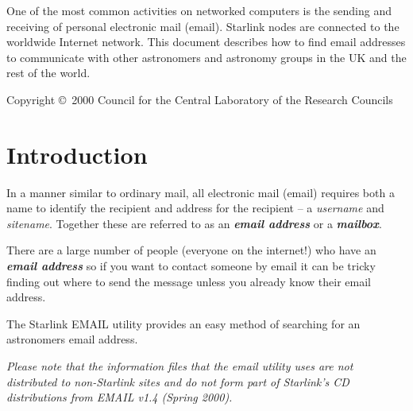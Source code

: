 \documentclass[twoside,11pt]{article}
\newcommand{\stardocinitials}  {SUN}
\newcommand{\stardoccopyright} 
{Copyright \copyright\ 2000 Council for the Central Laboratory of the Research Councils}
\newcommand{\stardocnumber}    {182.7}
\newcommand{\stardocabstract}  {
One of the most common activities on networked computers is the sending
and receiving of personal electronic mail (email).  Starlink nodes are
connected to the worldwide Internet network.  This document describes
how to find email addresses to communicate with other astronomers
and astronomy groups in the UK and the rest of the world.
}
\newcommand{\stardocname}{\stardocinitials /\stardocnumber}
\newenvironment{latexonly}{}{}
\newcommand{\xlabel}[1]{}
\renewcommand{\_}{\texttt{\symbol{95}}}
\renewcommand{\thepage}{\roman{page}}
\begin{document}
\stardocabstract


  \newpage
  \begin{latexonly}
    \setlength{\parskip}{0mm}
    \tableofcontents
\vspace*{\fill}
\stardoccopyright
    \setlength{\parskip}{\medskipamount}
    \markboth{\stardocname}{\stardocname}
  \end{latexonly}

\cleardoublepage
\renewcommand{\thepage}{\arabic{page}}
\setcounter{page}{1}


\section{\xlabel{introduction}Introduction}
\label{introduction}

In a manner similar to ordinary mail, all electronic mail (email)
requires both a name to identify the recipient and address for the
recipient -- a \textit{username} and \textit{sitename}.  Together these
are referred to as an \textbf{\textit{email address}} or a
\textbf{\textit{mailbox}}.

There are a large number of people (everyone on the internet!) who have
an \textbf{\textit{email address}} so if you want to contact someone by
email it can be tricky finding out where to send the message unless you
already know their email address.

The Starlink EMAIL utility provides an easy method of searching for 
an astronomers email address.

\textit{Please note that the information files that the email utility
uses are not distributed to non-Starlink sites and do not form part of
Starlink's CD distributions from EMAIL v1.4 (Spring 2000).}
\end{document}
